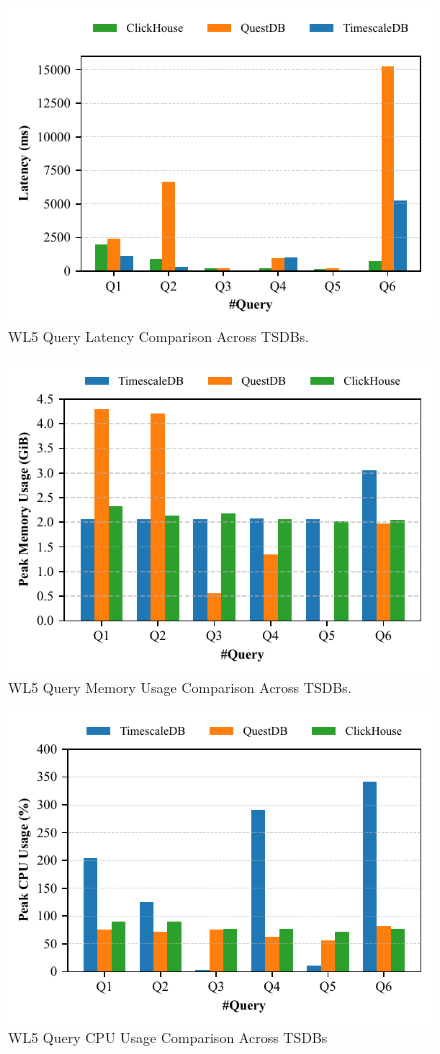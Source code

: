 \documentclass[conference]{IEEEtran}
\begin{document}
\begin{figure}[tb]
\centering
\includegraphics[width=0.8\linewidth]{1_query_latency_ieee.pdf}
\caption{WL5 Query Latency Comparison Across TSDBs.}
\label{fig:query_latency_comparison}
\end{figure}

\begin{figure}[tb]
\centering
\includegraphics[width=0.8\linewidth]{2_query_memory.pdf}
\caption{WL5 Query Memory Usage Comparison Across TSDBs.}
\label{fig:query_memory_comparison}
\end{figure}

\begin{figure}[tb]
\centering
\includegraphics[width=0.8\linewidth]{3_query_cpu.pdf}
\caption{WL5 Query CPU Usage Comparison Across TSDBs}
\label{fig:query_cpu_comparison}
\end{figure}
\end{document}
